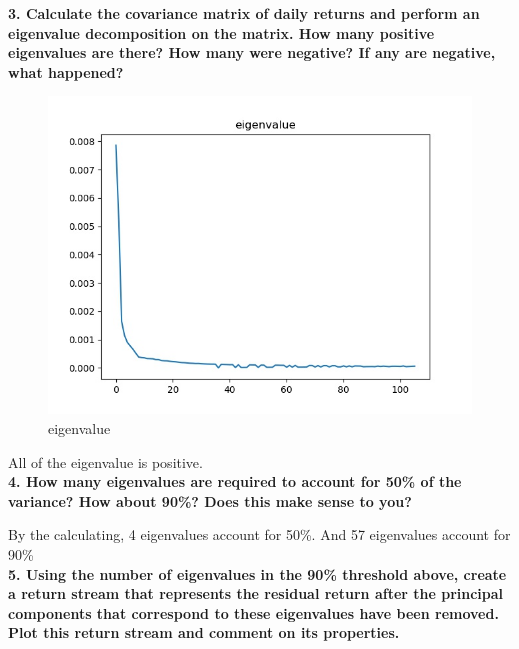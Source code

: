 \documentclass{winnower}
\begin{document}
\newpage

\textbf{3. Calculate the covariance matrix of daily returns and perform an eigenvalue decomposition on the matrix. How many positive eigenvalues are there? How many were negative? If any are negative, what happened?}

\begin{figure}[!h]
\begin{center}
\includegraphics[scale=0.5]{1_2.jpg}
\caption
{eigenvalue}
\label{fig:f1}
\end{center}
\end{figure}

All of the eigenvalue is positive.
\\


\textbf{4. How many eigenvalues are required to account for 50\% of the variance? How about 90\%? Does this make sense to you?}

By the calculating, 4 eigenvalues account for 50\%. And 57 eigenvalues account for 90\%
\\

\textbf{5. Using the number of eigenvalues in the 90\% threshold above, create a return stream that represents the residual return after the principal components that correspond to these eigenvalues have been removed. Plot this return stream and comment on its properties.}
\end{document}
